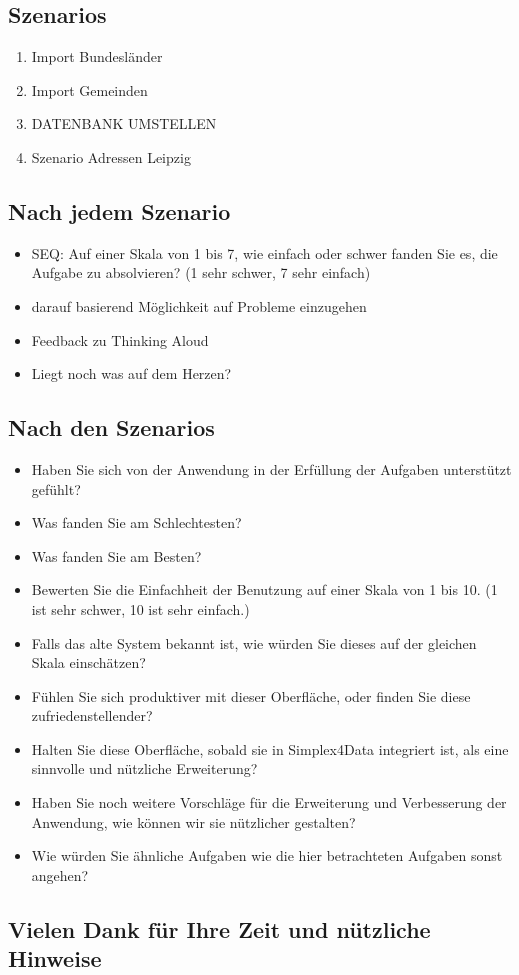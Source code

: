 \subsection*{Szenarios}
\begin{enumerate}
  \item Import Bundesländer
  \item Import Gemeinden
  \item[] DATENBANK UMSTELLEN
  \item Szenario Adressen Leipzig
\end{enumerate}

\subsection*{Nach jedem Szenario}
\begin{itemize}
  \item SEQ: Auf einer Skala von 1 bis 7, wie einfach oder schwer fanden Sie es, die Aufgabe zu absolvieren? (1 sehr schwer, 7 sehr einfach)
  \item darauf basierend Möglichkeit auf Probleme einzugehen
  \item Feedback zu Thinking Aloud
  \item Liegt noch was auf dem Herzen?
\end{itemize}

\subsection*{Nach den Szenarios}
\begin{itemize}
  \item Haben Sie sich von der Anwendung in der Erfüllung der Aufgaben unterstützt gefühlt?
  \item Was fanden Sie am Schlechtesten?
  \item Was fanden Sie am Besten?
  \item Bewerten Sie die Einfachheit der Benutzung auf einer Skala von 1 bis 10. (1 ist sehr schwer, 10 ist sehr einfach.)
  \item Falls das alte System bekannt ist, wie würden Sie dieses auf der gleichen Skala einschätzen?
  \item Fühlen Sie sich produktiver mit dieser Oberfläche, oder finden Sie diese zufriedenstellender?
  \item Halten Sie diese Oberfläche, sobald sie in Simplex4Data integriert ist, als eine sinnvolle und nützliche Erweiterung?
  \item Haben Sie noch weitere Vorschläge für die Erweiterung und Verbesserung der Anwendung, wie können wir sie nützlicher gestalten?
  \item Wie würden Sie ähnliche Aufgaben wie die hier betrachteten Aufgaben sonst angehen?
\end{itemize}

\subsection*{Vielen Dank für Ihre Zeit und nützliche Hinweise}
